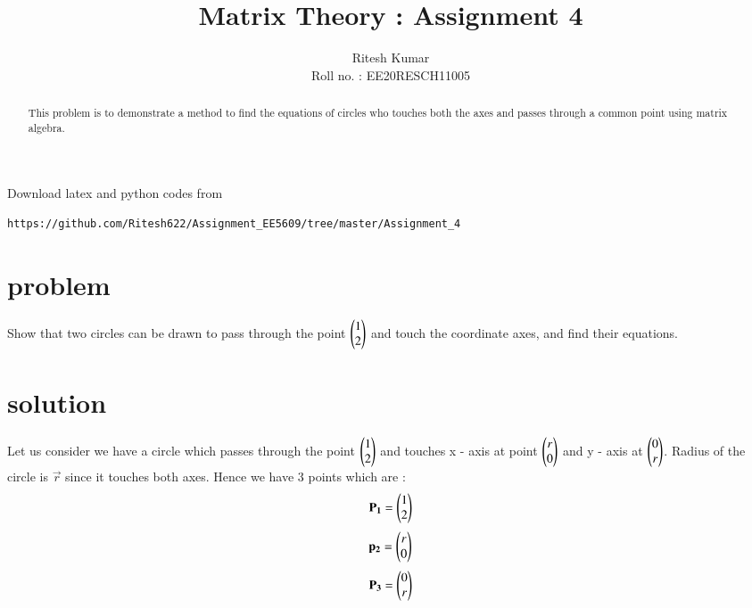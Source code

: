 \documentclass[journal,12pt,twocolumn]{IEEEtran}
\begin{document}
     \def\rightbox#1{\makebox[0in][r]{#1}}
     \def\centbox#1{\makebox[0in]{#1}}
     \def\topbox#1{\raisebox{-\baselineskip}[0in][0in]{#1}}
     \def\midbox#1{\raisebox{-0.5\baselineskip}[0in][0in]{#1}}
\vspace{3cm}
\title{ Matrix Theory : Assignment 4 }
\author{Ritesh Kumar \\ Roll no. : EE20RESCH11005 }
\maketitle
\newpage
\bigskip
\renewcommand{\thefigure}{\theenumi}
\renewcommand{\thetable}{\theenumi}
\begin{abstract}
This problem is to demonstrate a method to find the equations of circles who touches both the axes and passes through a common point using matrix algebra.
\end{abstract}
Download latex and python codes from 
\begin{lstlisting}
https://github.com/Ritesh622/Assignment_EE5609/tree/master/Assignment_4
\end{lstlisting}

\section{problem}
Show that two circles can be drawn to pass through the point
 $ \begin{pmatrix} 1 \\ 2 \\	\end{pmatrix} $  and touch the coordinate axes, and find their equations.


\section{solution}
Let us consider  we have a circle which passes through the point   $ \begin{pmatrix} 1 \\ 2 \\	\end{pmatrix} $  and touches  x - axis at point  $ \begin{pmatrix} r \\ 0 \\	\end{pmatrix} $ and y - axis  at $ \begin{pmatrix} 0 \\ r \\ \end{pmatrix} $. Radius of the circle is $\vec{r}$ since it touches both axes. Hence we have 3 points which are :
\begin{align}
\mathbf{P_{1}} = \begin{pmatrix} 1 \\ 2 \\\end{pmatrix}
\end{align}
\begin{align}
\mathbf{p_{2}} = \begin{pmatrix} r \\ 0 \\\end{pmatrix}
\end{align}
\begin{align}
\mathbf{P_{3}} = \begin{pmatrix} 0 \\ r \\\end{pmatrix} \label{2.3}
\end{align}
\end{document}
